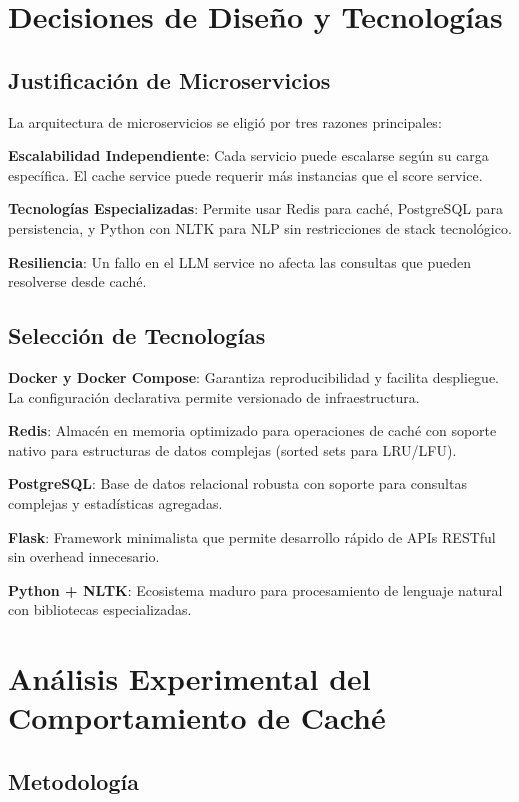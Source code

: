 \documentclass[12pt,a4paper]{article}
\begin{document}
\section{Decisiones de Diseño y Tecnologías}

\subsection{Justificación de Microservicios}

La arquitectura de microservicios se eligió por tres razones principales:

\textbf{Escalabilidad Independiente}: Cada servicio puede escalarse según su carga específica. El cache service puede requerir más instancias que el score service.

\textbf{Tecnologías Especializadas}: Permite usar Redis para caché, PostgreSQL para persistencia, y Python con NLTK para NLP sin restricciones de stack tecnológico.

\textbf{Resiliencia}: Un fallo en el LLM service no afecta las consultas que pueden resolverse desde caché.

\subsection{Selección de Tecnologías}

\textbf{Docker y Docker Compose}: Garantiza reproducibilidad y facilita despliegue. La configuración declarativa permite versionado de infraestructura.

\textbf{Redis}: Almacén en memoria optimizado para operaciones de caché con soporte nativo para estructuras de datos complejas (sorted sets para LRU/LFU).

\textbf{PostgreSQL}: Base de datos relacional robusta con soporte para consultas complejas y estadísticas agregadas.

\textbf{Flask}: Framework minimalista que permite desarrollo rápido de APIs RESTful sin overhead innecesario.

\textbf{Python + NLTK}: Ecosistema maduro para procesamiento de lenguaje natural con bibliotecas especializadas.

\section{Análisis Experimental del Comportamiento de Caché}

\subsection{Metodología}
\end{document}
